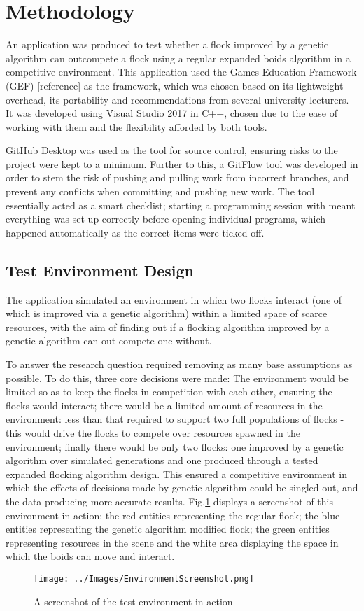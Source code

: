 \section{Methodology}
An application was produced to test whether a flock improved by a genetic algorithm can outcompete a flock using a regular expanded boids algorithm in a competitive environment. This application used the Games Education Framework (GEF) [reference] as the framework, which was chosen based on its lightweight overhead, its portability and recommendations from several university lecturers. It was developed using Visual Studio 2017 in C++, chosen due to the ease of working with them and the flexibility afforded by both tools.

GitHub Desktop was used as the tool for source control, ensuring risks to the project were kept to a minimum. Further to this, a GitFlow tool was developed in order to stem the risk of pushing and pulling work from incorrect branches, and prevent any conflicts when committing and pushing new work. The tool essentially acted as a smart checklist; starting a programming session with meant everything was set up correctly before opening individual programs, which happened automatically as the correct items were ticked off.


\subsection{Test Environment Design}
The application simulated an environment in which two flocks interact (one of which is improved via a genetic algorithm) within a limited space of scarce resources, with the aim of finding out if a flocking algorithm improved by a genetic algorithm can out-compete one without.

To answer the research question required removing as many base assumptions as possible. To do this, three core decisions were made: The environment would be limited so as to keep the flocks in competition with each other, ensuring the flocks would interact; there would be a limited amount of resources in the environment: less than that required to support two full populations of flocks - this would drive the flocks to compete over resources spawned in the environment; finally there would be only two flocks: one improved by a genetic algorithm over simulated generations and one produced through a tested expanded flocking algorithm design. This ensured a competitive environment in which the effects of decisions made by genetic algorithm could be singled out, and the data producing more accurate results. Fig.\ref{fig:EnvScrnshot} displays a screenshot of this environment in action: the red entities representing the regular flock; the blue entities representing the genetic algorithm modified flock; the green entities representing resources in the scene and the white area displaying the space in which the boids can move and interact.
\begin{figure}
	\texttt{[image: ../Images/EnvironmentScreenshot.png]}
	\caption{A screenshot of the test environment in action}
	\label{fig:EnvScrnshot}
\end{figure}



